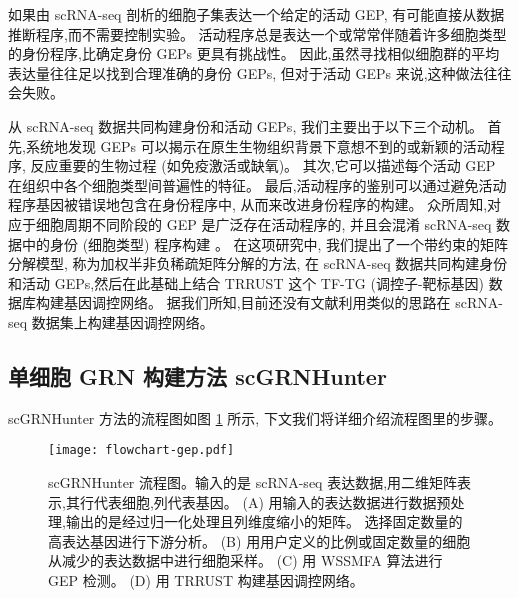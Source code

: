 如果由 scRNA-seq 剖析的细胞子集表达一个给定的活动 GEP,
有可能直接从数据推断程序,而不需要控制实验。
活动程序总是表达一个或常常伴随着许多细胞类型的身份程序,比确定身份 GEPs 更具有挑战性。
因此,虽然寻找相似细胞群的平均表达量往往足以找到合理准确的身份 GEPs,
但对于活动 GEPs 来说,这种做法往往会失败。

从 scRNA-seq 数据共同构建身份和活动 GEPs, 我们主要出于以下三个动机。
首先,系统地发现 GEPs 可以揭示在原生生物组织背景下意想不到的或新颖的活动程序,
反应重要的生物过程 (如免疫激活或缺氧)。
其次,它可以描述每个活动 GEP 在组织中各个细胞类型间普遍性的特征。
最后,活动程序的鉴别可以通过避免活动程序基因被错误地包含在身份程序中, 从而来改进身份程序的构建。
众所周知,对应于细胞周期不同阶段的 GEP 是广泛存在活动程序的,
并且会混淆 scRNA-seq 数据中的身份 (细胞类型) 程序构建 \cite{scialdone2015computational,chen2017controlling}。
在这项研究中, 我们提出了一个带约束的矩阵分解模型, 称为加权半非负稀疏矩阵分解的方法,
在 scRNA-seq 数据共同构建身份和活动 GEPs,然后在此基础上结合 TRRUST 这个 TF-TG (调控子-靶标基因) 数据库构建基因调控网络。
据我们所知,目前还没有文献利用类似的思路在 scRNA-seq 数据集上构建基因调控网络。

\subsection{单细胞 GRN 构建方法 scGRNHunter}

scGRNHunter 方法的流程图如图 \ref{fig:gep-flowchart} 所示, 下文我们将详细介绍流程图里的步骤。
\begin{figure}[!htbp]
    \centering
    \texttt{[image: flowchart-gep.pdf]}
    \caption{
        scGRNHunter 流程图。输入的是 scRNA-seq 表达数据,用二维矩阵表示,其行代表细胞,列代表基因。
        (A) 用输入的表达数据进行数据预处理,输出的是经过归一化处理且列维度缩小的矩阵。
        选择固定数量的高表达基因进行下游分析。
        (B) 用用户定义的比例或固定数量的细胞从减少的表达数据中进行细胞采样。
        (C) 用 WSSMFA 算法进行 GEP 检测。
        (D) 用 TRRUST 构建基因调控网络。
    }
    \label{fig:gep-flowchart}
\end{figure}

